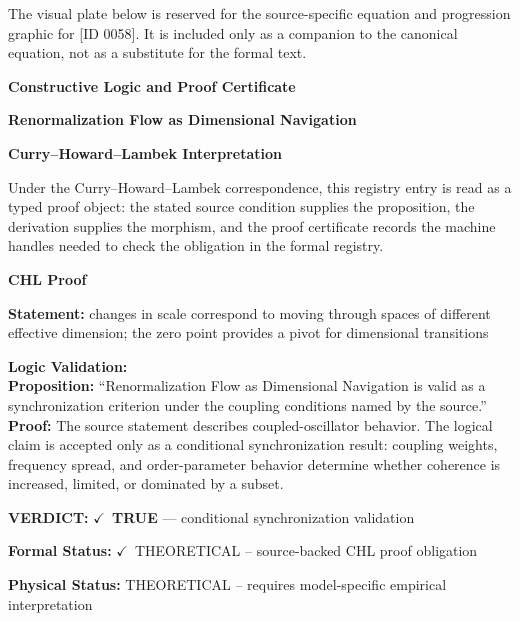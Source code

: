 \begingroup\footnotesize\sloppy
The visual plate below is reserved for the source-specific equation and progression graphic for [ID 0058]. It is included only as a companion to the canonical equation, not as a substitute for the formal text.
\par\endgroup
\ifTZPDarkEdition
{}
\fi

\clearpage
\begingroup\tzpsupportsetup
\noindent\textbf{\fontsize{10.8pt}{12.8pt}\selectfont [ID 0058] Constructive Logic and Proof Certificate}\par
\noindent\textbf{\fontsize{10pt}{12pt}\selectfont Renormalization Flow as Dimensional Navigation}\par
\vspace{0.45em}
\begingroup
\footnotesize
\setlength{\parskip}{0.22em}
\setlength{\parindent}{0pt}
\noindent\textbf{Curry--Howard--Lambek Interpretation}\par
Under the Curry--Howard--Lambek correspondence, this registry entry is read as a typed proof
object: the stated source condition supplies the proposition, the derivation supplies the
morphism, and the proof certificate records the machine handles needed to check the obligation
in the formal registry.

\vspace{0.45em}
\noindent\textbf{CHL Proof}\par
\textbf{Statement:} changes in scale correspond to moving through spaces of different effective dimension;
the zero point provides a pivot for dimensional transitions

\textbf{Logic Validation:}\\
\textbf{Proposition:} ``Renormalization Flow as Dimensional Navigation is valid as a synchronization criterion
under the coupling conditions named by the source.''\\
\textbf{Proof:} The source statement describes coupled-oscillator behavior. The logical claim is
accepted only as a conditional synchronization result: coupling weights, frequency
spread, and order-parameter behavior determine whether coherence is increased, limited,
or dominated by a subset.

\textbf{VERDICT:} \ensuremath{\checkmark}\ \textbf{TRUE} --- conditional synchronization validation

\textbf{Formal Status:} \ensuremath{\checkmark}\ THEORETICAL -- source-backed CHL proof obligation

\textbf{Physical Status:} THEORETICAL -- requires model-specific empirical interpretation
\par\vspace{0.45em}
\par
\ifTZPDarkEdition
{}
\fi
\endgroup
\endgroup
